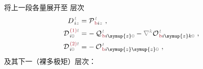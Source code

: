 将上一段各量展开至  层次
\begin{subequations} \label{eq:DH^(2-0)_0}
\begin{align}
	D^{\;\!\mathcolor{gray}{t}}_{\;\! i\mathcolor{gray}{z}} &= {\mathcal{P}}^{\;\!\mathcolor{gray}{t}}_{\;\!\textcolor{Maroon}{\text{b}} i \mathcolor{gray}{z}}~, \label{eq:D^(0)} \\
	{\mathcal{D}}^{\;\!\textcolor{Maroon}{(1)}\mathcolor{gray}{t}}_{\;\! i\mathcolor{gray}{0}} &= -\hspace{0.2em} {\mathcal{Q}}^{\;\!\mathcolor{gray}{t}}_{\;\!\textcolor{Maroon}{\text{b}} i\symup{z} \mathcolor{gray}{0}} - \mathcolor{gray}{\nabla^k} {\mathcal{O}}^{\;\!\mathcolor{gray}{t}}_{\;\!\textcolor{Maroon}{\text{b}} i\symup{z}k \mathcolor{gray}{0}}~, \label{eq:D^(1)_0} \\
	{\mathcal{D}}^{\;\!\textcolor{Maroon}{(2)}\mathcolor{gray}{t}}_{\;\! i\mathcolor{gray}{0}} &= -\hspace{0.2em} {\mathcal{O}}^{\;\!\mathcolor{gray}{t}}_{\;\!\textcolor{Maroon}{\text{b}} i \symup{z}\symup{z} \mathcolor{gray}{0}}~, \label{eq:D^(2)_0}
\end{align}
\end{subequations}
及其下一（裸多极矩）层次\cite{OriginDependenceMaterial,langeCompletionMultipoleTheory2003,raabTransformedMultipoleTheory2005,grahamMultipoleSolutionMacroscopic2000}：
